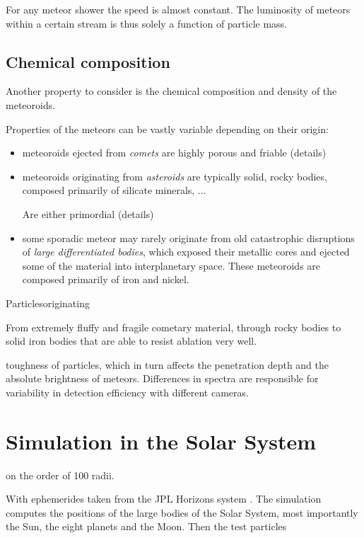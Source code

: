         For any meteor shower the speed is almost constant. The luminosity of meteors
        within a certain stream is thus solely a function of particle mass.

    \subsection{Chemical composition} \label{mac}
        Another property to consider is the chemical composition and density of the meteoroids.


        Properties of the meteors can be vastly variable depending on their origin:
        \begin{itemize}
            \item meteoroids ejected from \emph{comets} are highly porous and friable
                (details)
            \item meteoroids originating from \emph{asteroids} are typically solid,
                rocky bodies, composed primarily of silicate minerals, ...

                Are either primordial
                (details)
            \item some sporadic meteor may rarely originate from old catastrophic disruptions
                of \emph{large differentiated bodies}, which exposed their metallic cores
                and ejected some of the material into interplanetary space.
                These meteoroids are composed primarily of iron and nickel.
        \end{itemize}
        Particlesoriginating

        From extremely fluffy and fragile cometary material, through rocky bodies
        to solid iron bodies that are able to resist ablation very well.

        toughness of particles, which in turn affects the penetration depth
        and the absolute brightness of meteors.
        Differences in spectra are responsible for variability in detection efficiency with different cameras.

\section{Simulation in the Solar System} \label{as}
    on the order of 100 radii.

    With ephemerides taken from the JPL Horizons system \citep{...}.
    The simulation computes the positions of the large bodies of the Solar System, most importantly the Sun,
    the eight planets and the Moon. Then the test particles

